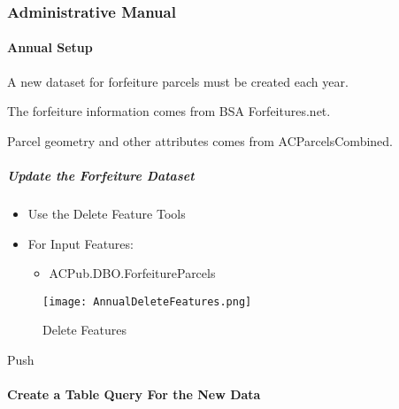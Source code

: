  \subsubsection{Administrative Manual}

 \paragraph{Annual Setup}

 A new dataset for forfeiture parcels must be created each year.

 \noindent The forfeiture information comes from BSA Forfeitures.net.

 \noindent Parcel geometry and other attributes comes from ACParcelsCombined.

 \subparagraph{Update the Forfeiture Dataset}

 \begin{itemize}
 \item {\Large Use the Delete Feature Tools}
 \item {\Large For Input Features:}
 \begin{itemize}
 \item {\Large ACPub.DBO.ForfeitureParcels}
 \end{itemize}
 \end{itemize}

 \vspace{.1in}

 \begin{figure}[h!]
 \centering
     \texttt{[image: AnnualDeleteFeatures.png]}
 \caption{Delete Features}
 \end{figure}
 \vspace{.15in}

{\bigbtn Push }
 \clearpage
 \paragraph{Create a Table Query For the New Data}
 \vspace{.25in}

